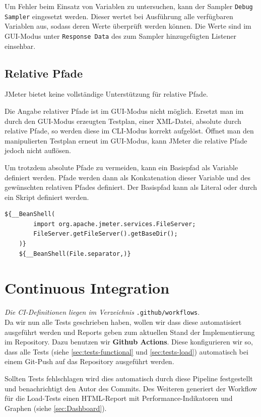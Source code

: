 Um Fehler beim Einsatz von Variablen zu untersuchen,
kann der Sampler \texttt{Debug Sampler} eingesetzt werden.
Dieser wertet bei Ausführung alle verfügbaren Variablen aus, sodass deren Werte überprüft werden können.
Die Werte sind im GUI-Modus unter \texttt{Response Data} des zum Sampler hinzugefügten Listener einsehbar.

\subsection{Relative Pfade}

JMeter bietet keine vollständige Unterstützung für relative Pfade.

Die Angabe relativer Pfade ist im GUI-Modus nicht möglich.
Ersetzt man im durch den GUI-Modus erzeugten Testplan, einer XML-Datei, absolute durch relative Pfade,
so werden diese im CLI-Modus korrekt aufgelöst.
Öffnet man den manipulierten Testplan erneut im GUI-Modus,
kann JMeter die relative Pfade jedoch nicht auflösen.

Um trotzdem absolute Pfade zu vermeiden, 
kann ein Basispfad als Variable definiert werden.
Pfade werden dann als Konkatenation dieser Variable und des gewünschten relativen Pfades definiert.
Der Basispfad kann als Literal oder durch ein Skript definiert werden.

\begin{lstlisting}[caption=Ermitteln des Working Directory\protect\footnotemark]
    ${__BeanShell(
        import org.apache.jmeter.services.FileServer; 
        FileServer.getFileServer().getBaseDir();
    )}
    ${__BeanShell(File.separator,)}
\end{lstlisting}

\section{Continuous Integration}\label{sec:CI}

\textit{Die \ac{CI}-Definitionen liegen im Verzeichnis} \texttt{.github/workflows}.\\

Da wir nun alle Tests geschrieben haben, wollen wir dass diese automatisiert ausgeführt werden und Reports geben zum aktuellen Stand der Implementierung im Repository. Dazu benutzen wir \textbf{Github Actions}. Diese konfigurieren wir so, dass alle Tests (siehe \ref{sec:tests-functional} und \ref{sec:tests-load}) automatisch bei einem Git-Push auf das Repository ausgeführt werden.

Sollten Tests fehlschlagen wird dies automatisch durch diese Pipeline festgestellt und benachrichtigt den Autor des Commits.
Des Weiteren generiert der Workflow für die Load-Tests einen HTML-Report mit Performance-Indikatoren und Graphen (siehe \ref{sec:Dashboard}).
